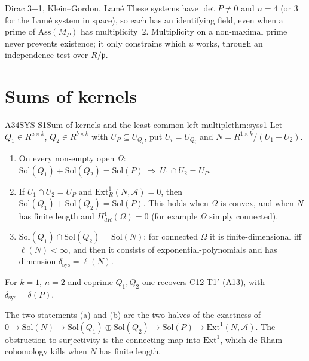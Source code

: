 \begin{example}{Dirac 3+1, Klein--Gordon, Lam\'e}
These systems have $\det P\ne0$ and $n=4$ (or $3$ for the Lam\'e system in space), so each has an identifying field, even when a prime of $\mathrm{Ass}(M_P)$ has multiplicity~$2$. Multiplicity on a non-maximal prime never prevents existence; it only constrains which $u$ works, through an independence test over $R/\mathfrak p$.
\end{example}

\section{Sums of kernels}

\begin{dimcard}{A34}{SYS-S1}{Sum of kernels and the least common left multiple}{\proved}{thm:syss1}
Let $Q_1\in R^{a\times k}$, $Q_2\in R^{b\times k}$ with $U_P\subseteq U_{Q_i}$, put $U_i=U_{Q_i}$ and $N=R^{1\times k}/(U_1+U_2)$.
\begin{enumerate}[label=(\alph*)]
\item On every non-empty open $\Omega$: $\mathrm{Sol}(Q_1)+\mathrm{Sol}(Q_2)=\mathrm{Sol}(P)\ \Rightarrow\ U_1\cap U_2=U_P$.
\item If $U_1\cap U_2=U_P$ and $\mathrm{Ext}^1_R(N,\mathcal A)=0$, then $\mathrm{Sol}(Q_1)+\mathrm{Sol}(Q_2)=\mathrm{Sol}(P)$. This holds when $\Omega$ is convex, and when $N$ has finite length and $H^1_{dR}(\Omega)=0$ (for example $\Omega$ simply connected).
\item $\mathrm{Sol}(Q_1)\cap\mathrm{Sol}(Q_2)=\mathrm{Sol}(N)$; for connected $\Omega$ it is finite-dimensional iff $\ell(N)<\infty$, and then it consists of exponential-polynomials and has dimension $\delta_{\mathrm{sys}}=\ell(N)$.
\end{enumerate}
For $k=1$, $n=2$ and coprime $Q_1,Q_2$ one recovers C12-T1$'$ (A13), with $\delta_{\mathrm{sys}}=\delta(P)$.
\end{dimcard}

\begin{proofidea}
The two statements (a) and (b) are the two halves of the exactness of $0\to\mathrm{Sol}(N)\to\mathrm{Sol}(Q_1)\oplus\mathrm{Sol}(Q_2)\to\mathrm{Sol}(P)\to\mathrm{Ext}^1(N,\mathcal A)$. The obstruction to surjectivity is the connecting map into $\mathrm{Ext}^1$, which de Rham cohomology kills when $N$ has finite length.
\end{proofidea}

